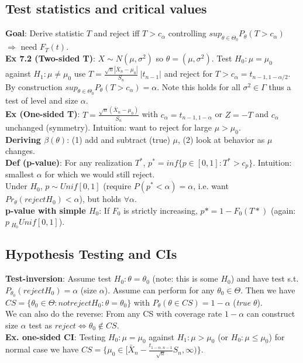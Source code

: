 \subsection{Test statistics and critical values}
\textbf{Goal}: Derive statistic $T$ and reject iff $T>c_\alpha$ controlling $sup_{\theta\in\Theta_0}P_\theta(T>c_\alpha)$ $\Rightarrow$ need $F_T(t)$.\\
\textbf{Ex 7.2 (Two-sided T)}: $X\sim N(\mu, \sigma^2)$ so $\theta = (\mu, \sigma^2)$. Test $H_0:\mu=\mu_0$ against $H_1:\mu\neq\mu_0$ use $T = \frac{\sqrt{n}|\bar{X}_n-\mu_0|}{S_n} ~ |t_{n-1}|$ and reject for $T > c_\alpha = t_{n-1, 1-\alpha/2}$. By construction $sup_{\theta\in\Theta_0}P_\theta(T>c_\alpha)=\alpha$. \footnotesize{Note this holds for all $\sigma^2\in\Gamma$ thus a test of level and size $\alpha$.}\\
\textbf{Ex (One-sided T)}: $T = \frac{\sqrt{n}(\bar{X}_n-\mu_0)}{S_n}$ with $c_\alpha = t_{n-1, 1-\alpha}$ or $Z = -T$ and $c_\alpha$ unchanged (symmetry). Intuition: want to reject for large $\mu > \mu_0$.\\
\textbf{Deriving $\beta(\theta)$}: (1) add and subtract (true) $\mu$, (2) look at behavior as $\mu$ changes. \\
\textbf{Def (p-value)}: For any realization $T^*$, $p^* = inf\{p\in[0,1]: T^*>c_p\}$. Intuition: smallest $\alpha$ for which we would still reject. \\\footnotesize{Under $H_0$, $p\sim Unif[0,1]$ (require $P(p^*<\alpha)=\alpha$, i.e. want $Pr_\theta(reject H_0) < \alpha$), but holds $\forall\alpha$.}\\
\textbf{p-value with simple $H_0$}: If $F_0$ is strictly increasing, $p* = 1 - F_0(T*)$ (again: $p~_{H_0}Unif[0,1]$).


\subsection{Hypothesis Testing and CIs}
\textbf{Test-inversion}: Assume test $H_0: \theta = \theta_0$ (note: this is some $H_0$) and have test s.t. $P_{\theta_0}(reject H_0) = \alpha$ (size $\alpha$). Assume can perform for any $\theta_0 \in \Theta$. Then we have $CS = \{\theta_0\in\Theta: not reject H_0: \theta=\theta_0\}$ with $P_\theta(\theta\in CS) = 1-\alpha$ (\textit{true} $\theta$).\\
We can also do the reverse: From any CS with coverage rate $1-\alpha$ can construct size $\alpha$ test as $reject\Leftrightarrow \theta_0\notin CS$.\\
\textbf{Ex. one-sided CI}: Testing $H_0: \mu = \mu_0$ against $H_1:\mu>\mu_0$ (or $H_0: \mu \leq \mu_0$) for normal case we have $CS = \{\mu_0 \in [\bar{X}_n - \frac{t_{1-\alpha, n-1}}{\sqrt{n}}S_n, \infty)\}$.

